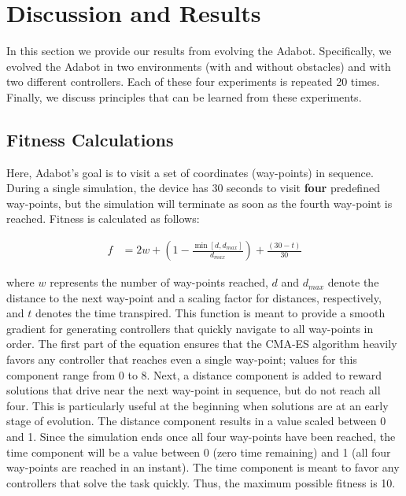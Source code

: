 \section{Discussion and Results}
\label{sec:results}

In this section we provide our results from evolving the Adabot.
%
Specifically, we evolved the Adabot in two environments (with and without obstacles) and with two different controllers. Each of these four experiments is repeated 20 times.
%
Finally, we discuss principles that can be learned from these experiments.


\subsection{Fitness Calculations}

%
Here, Adabot's goal is to visit a set of coordinates (way-points) in sequence.
%
During a single simulation, the device has 30 seconds to visit \textbf{four} predefined way-points, but the simulation will terminate as soon as the fourth way-point is reached.
%
Fitness is calculated as follows:

\vspace{-0.15in}

\begin{align}
    f &= 2w + (1-\frac{\min[d, d_\mathit{max}]}{d_\mathit{max}}) + \frac{(30 - t)}{30}
\end{align}

\noindent
where $w$ represents the number of way-points reached, $d$ and $d_\mathit{max}$ denote the distance to the next way-point and a scaling factor for distances, respectively, and $t$ denotes the time transpired.
%
This function is meant to provide a smooth gradient for generating controllers that quickly navigate to all way-points in order.
%
The first part of the equation ensures that the CMA-ES algorithm heavily favors any controller that reaches even a single way-point; values for this component range from 0 to 8.
%
Next, a distance component is added to reward solutions that drive near the next way-point in sequence, but do not reach all four. This is particularly useful at the beginning when solutions are at an early stage of evolution.
%
The distance component results in a value scaled between 0 and 1.
%
Since the simulation ends once all four way-points have been reached, the time component will be a value between 0 (zero time remaining) and 1 (all four way-points are reached in an instant).
%
The time component is meant to favor any controllers that solve the task quickly.
%
Thus, the maximum possible fitness is 10.


